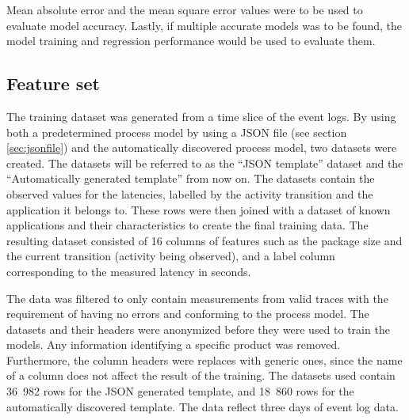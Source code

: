Mean absolute error and the mean square error values were to be used to evaluate model accuracy.
Lastly, if multiple accurate models was to be found, the model training and regression performance would be used to evaluate them.

\subsection{Feature set}
\label{sec:featureset}

The training dataset was generated from a time slice of the event logs. 
By using both a predetermined process model by using a JSON file (see section \ref{sec:jsonfile}) and the automatically discovered process model, two datasets were created. 
The datasets will be referred to as the ``JSON template'' dataset and the ``Automatically generated template'' from now on.
The datasets contain the observed values for the latencies, labelled by the activity transition and the application it belongs to.
These rows were then joined with a dataset of known applications and their characteristics to create the final training data.
The resulting dataset consisted of 16 columns of features such as the package size and the current transition (activity being observed), and a label column corresponding to the measured latency in seconds. 

The data was filtered to only contain measurements from valid traces with the requirement of having no errors and conforming to the process model.
The datasets and their headers were anonymized before they were used to train the models.
Any information identifying a specific product was removed.
Furthermore, the column headers were replaces with generic ones, since the name of a column does not affect the result of the training.
The datasets used contain 36~982 rows for the JSON generated template, and 18~860 rows for the automatically discovered template.
The data reflect three days of event log data.


